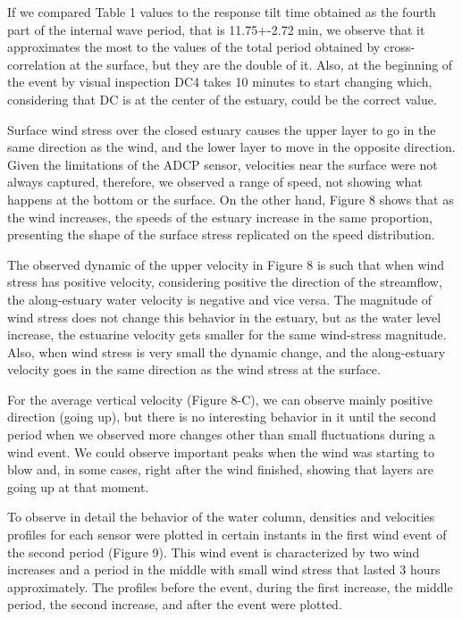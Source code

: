 \documentclass[tesis.tex]{subfiles}
\begin{document}
    If we compared Table 1 values to the response tilt time obtained as the fourth part of the internal wave period, that is 11.75+-2.72 min, we observe that it approximates the most to the values of the total period obtained by cross-correlation at the surface, but they are the double of it. Also, at the beginning of the event by visual inspection DC4 takes 10 minutes to start changing which, considering that DC is at the center of the estuary, could be the correct value.

    Surface wind stress over the closed estuary causes the upper layer to go in the same direction as the wind, and the lower layer to move in the opposite direction. Given the limitations of the ADCP sensor, velocities near the surface were not always captured, therefore, we observed a range of speed, not showing what happens at the bottom or the surface. On the other hand, Figure 8 shows that as the wind increases, the speeds of the estuary increase in the same proportion, presenting the shape of the surface stress replicated on the speed distribution.
    
    
    The observed dynamic of the upper velocity in Figure 8 is such that when wind stress has positive velocity, considering positive the direction of the streamflow, the along-estuary water velocity is negative and vice versa. The magnitude of wind stress does not change this behavior in the estuary, but as the water level increase, the estuarine velocity gets smaller for the same wind-stress magnitude. Also, when wind stress is very small the dynamic change, and the along-estuary velocity goes in the same direction as the wind stress at the surface. 
    
    For the average vertical velocity (Figure 8-C), we can observe mainly positive direction (going up), but there is no interesting behavior in it until the second period when we observed more changes other than small fluctuations during a wind event. We could observe important peaks when the wind was starting to blow and, in some cases, right after the wind finished, showing that layers are going up at that moment.
    
    To observe in detail the behavior of the water column, densities and velocities profiles for each sensor were plotted in certain instants in the first wind event of the second period (Figure 9). This wind event is characterized by two wind increases and a period in the middle with small wind stress that lasted 3 hours approximately. The profiles before the event, during the first increase, the middle period, the second increase, and after the event were plotted.
    
\end{document}

